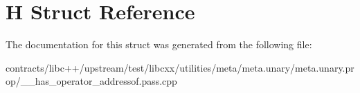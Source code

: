 \hypertarget{struct_h}{}\section{H Struct Reference}
\label{struct_h}


The documentation for this struct was generated from the following file\+:\begin{DoxyCompactItemize}
\item 
contracts/libc++/upstream/test/libcxx/utilities/meta/meta.\+unary/meta.\+unary.\+prop/\+\_\+\+\_\+has\+\_\+operator\+\_\+addressof.\+pass.\+cpp\end{DoxyCompactItemize}
